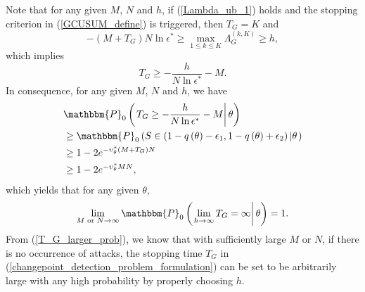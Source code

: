 \documentclass[11pt, draftclsnofoot, onecolumn]{IEEEtran}
\newcommand{\bbP}{\mathbbm{P}}
\begin{document}
\begin{IEEEproof}
Note that for any given $M$, $N$ and $h$, if (\ref{Lambda_ub_1}) holds and the stopping criterion in (\ref{GCUSUM_define}) is triggered, then $T_G = K$ and
\begin{equation}
- \left( {M + T_G} \right)N\ln {\epsilon ^*} \ge {\mathop {\max }\limits_{1 \le k \le K} \Lambda _G^{(k,K)}} \ge h,
\end{equation}
which implies
\begin{equation}
{T_G} \ge  - \frac{h}{{N\ln {\epsilon ^*}}} - M.
\end{equation}
In consequence, for any given $M$, $N$ and $h$, we have
\begin{align} \notag
& {\bbP_0}\left( { \left. {T_G} \ge  - \frac{h}{{N\ln {\epsilon ^*}}} - M \right| \theta  } \right) \\ \notag
&  \ge {\bbP_0}\left( {S \in \left( {1 - q\left( \theta  \right) - {\epsilon _1},1 - q\left( \theta  \right) + {\epsilon _2}} \right)\left| \theta  \right.} \right)\\ \notag
& \ge 1 - 2{e^{ - \upsilon _\theta ^*\left( {M + {T_G}} \right)N}}\\ \label{T_G_larger_prob}
& \ge 1 - 2{e^{ - \upsilon _\theta ^*MN}},
\end{align}
which yields that for any given $\theta$,
\begin{equation}
\mathop {\lim }\limits_{M \text{ or } N \to \infty } {\bbP_0}\left( {\left. {\mathop {\lim }\limits_{h \to \infty } {T_G} = \infty } \right|\theta } \right) = 1.
\end{equation}
From (\ref{T_G_larger_prob}), we know that with sufficiently large $M$ or $N$, if there is no occurrence of attacks, the stopping time $T_G$ in (\ref{changepoint_detection_problem_formulation}) can be set to be arbitrarily large with any high probability by properly choosing $h$.
\end{IEEEproof}
\end{document}
